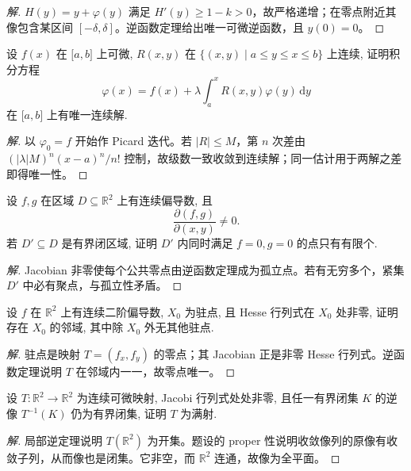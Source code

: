 \documentclass[../../数学分析培优讲义(答案版).tex]{subfiles}
\begin{document}
\begin{proof}[解]
$H(y)=y+\varphi(y)$ 满足 $H'(y)\geq1-k>0$，故严格递增；在零点附近其像包含某区间 $[-\delta,\delta]$。逆函数定理给出唯一可微逆函数，且 $y(0)=0$。
\end{proof}

\begin{example}
设 $f(x)$ 在 $\lbrack a,b\rbrack$ 上可微, $R(x,y)$ 在 $\{(x,y)\mid a\leq y\leq x\leq b\}$ 上连续, 证明积分方程
\[
    \varphi(x)=f(x)+\lambda\int_a^xR(x,y)\varphi(y)\,\mathrm{d}y
\]
在 $\lbrack a,b\rbrack$ 上有唯一连续解.
\end{example}

\begin{proof}[解]
以 $\varphi_0=f$ 开始作 Picard 迭代。若 $|R|\leq M$，第 $n$ 次差由 $(|\lambda|M)^n(x-a)^n/n!$ 控制，故级数一致收敛到连续解；同一估计用于两解之差即得唯一性。
\end{proof}

\begin{example}
设 $f,g$ 在区域 $D\subseteq\mathbb{R}^2$ 上有连续偏导数, 且
\[
    \dfrac{\partial(f,g)}{\partial(x,y)}\ne0.
\]
若 $D'\subseteq D$ 是有界闭区域, 证明 $D'$ 内同时满足 $f=0,g=0$ 的点只有有限个.
\end{example}

\begin{proof}[解]
Jacobian 非零使每个公共零点由逆函数定理成为孤立点。若有无穷多个，紧集 $D'$ 中必有聚点，与孤立性矛盾。
\end{proof}

\begin{example}
设 $f$ 在 $\mathbb{R}^2$ 上有连续二阶偏导数, $X_0$ 为驻点, 且 Hesse 行列式在 $X_0$ 处非零, 证明存在 $X_0$ 的邻域, 其中除 $X_0$ 外无其他驻点.
\end{example}

\begin{proof}[解]
驻点是映射 $T=(f_x,f_y)$ 的零点；其 Jacobian 正是非零 Hesse 行列式。逆函数定理说明 $T$ 在邻域内一一，故零点唯一。
\end{proof}

\begin{example}
设 $T:\mathbb{R}^2\to\mathbb{R}^2$ 为连续可微映射, Jacobi 行列式处处非零, 且任一有界闭集 $K$ 的逆像 $T^{-1}(K)$ 仍为有界闭集, 证明 $T$ 为满射.
\end{example}

\begin{proof}[解]
局部逆定理说明 $T(\mathbb R^2)$ 为开集。题设的 proper 性说明收敛像列的原像有收敛子列，从而像也是闭集。它非空，而 $\mathbb R^2$ 连通，故像为全平面。
\end{proof}
\end{document}
